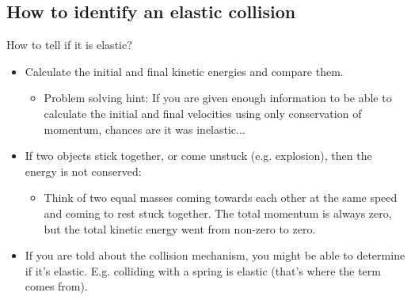 \documentclass[aspectratio=169,
hyperref={colorlinks,urlcolor=blue}
]{beamer}
\begin{document}
\subsection{How to identify an elastic collision}
\label{subsec:howtoidentifyanelasticcollision}
\begin{frame}{How to tell if it is elastic?}
\begin{itemize}
\item Calculate the initial and final kinetic energies and compare them. 
\begin{itemize}
\item Problem solving hint: If you are given enough information to be able to calculate the initial and final velocities using only conservation of momentum, chances are it was inelastic...
\end{itemize}
\item If two objects stick together, or come unstuck (e.g. explosion), then the energy is not conserved:
\begin{itemize}
\item Think of two equal masses coming towards each other at the same speed and coming to rest stuck together. The total momentum is always zero, but the total kinetic energy went from non-zero to zero.
\end{itemize}
\item If you are told about the collision mechanism, you might be able to determine if it’s elastic. E.g. colliding with a spring is elastic (that’s where the term comes from).
\end{itemize}
\end{frame}




\end{document}
